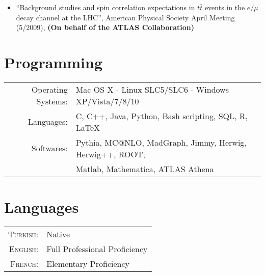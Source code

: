 \documentclass[a4paper,10pt]{article}
\begin{document}
\begin{itemize}
	\\ {\bf (On behalf of the ATLAS Collaboration)}
	\item ``Background studies and spin correlation expectations in $t\bar{t}$ events in the $e/\mu$ decay channel at the LHC'',
	American Physical Society April Meeting (5/2009), {\bf (On behalf of the ATLAS Collaboration)}
\end{itemize} 

\vspace{3mm}
\section{Programming}
\begin{tabular}{rl}
Operating Systems: 	& Mac OS X - Linux SLC5/SLC6 - Windows XP/Vista/7/8/10 	\\
Languages: 		& C, C++, Java, Python, Bash scripting, SQL, R, \LaTeX				\\
Softwares: 		& Pythia, MC@NLO, MadGraph, Jimmy, Herwig, Herwig++, ROOT,		\\
				& Matlab, Mathematica, ATLAS Athena 							\\
\end{tabular}

\vspace{3mm}
\section{Languages}

\begin{tabular}{rl}
\textsc{Turkish:}	& Native					\\
\textsc{English:}	& Full Professional Proficiency	\\
\textsc{French:}		& Elementary Proficiency		\\
\end{tabular}
\end{document}
